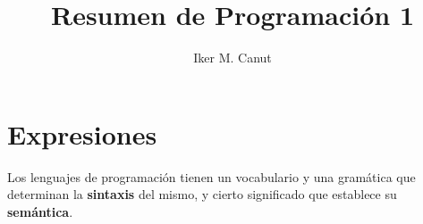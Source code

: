 \documentclass[11pt,a4paper]{article}
\begin{document}
\title{Resumen de Programación 1}
\author{Iker M. Canut}
\maketitle
\newpage

\tableofcontents
\newpage

\section{Expresiones}
Los lenguajes de programación tienen un vocabulario y una gramática que determinan la \textbf{sintaxis} del mismo, y cierto significado que establece su \textbf{semántica}.
\end{document}
